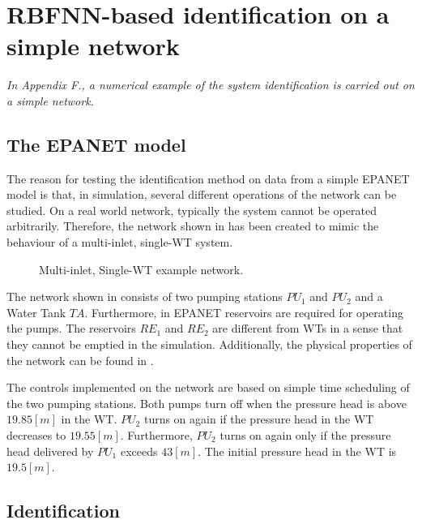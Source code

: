 \chapter{RBFNN-based identification on a simple network}
\label{NN_based_example}

\emph{In Appendix F., a numerical example of the system identification is carried out on a simple network.}

\section{The EPANET model}
\label{example1_EPANET}

The reason for testing the identification method on data from a simple EPANET model is that, in simulation, several different operations of the network can be studied. On a real world network, typically the system cannot be operated arbitrarily. Therefore, the network shown in  has been created to mimic the behaviour of a multi-inlet, single-WT system. 

\begin{figure}[H]
\centering
 
\caption{Multi-inlet, Single-WT example network.}
\label{fig:epanet_example1_id}
\end{figure}
\vspace{-3mm}

The network shown in  consists of two pumping stations $PU_1$ and $PU_2$ and a Water Tank $TA$. Furthermore, in EPANET reservoirs are required for operating the pumps. The reservoirs $RE_1$ and $RE_2$ are different from WTs in a sense that they cannot be emptied in the simulation. Additionally, the physical properties of the network can be found in . 

The controls implemented on the network are based on simple time scheduling of the two pumping stations. Both pumps turn off when the pressure head is above $19.85 [m]$ in the WT. $PU_2$ turns on again if the pressure head in the WT decreases to $19.55 [m]$. Furthermore, $PU_2$ turns on again only if the pressure head delivered by $PU_1$ exceeds $43 [m]$. The initial pressure head in the WT is $19.5 [m]$.

\section{Identification}
\label{NN_based_example1} 

